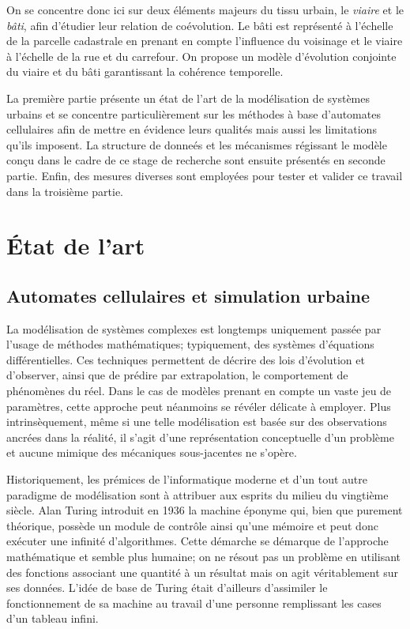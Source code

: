 \documentclass[12pt]{article}
\begin{document}
On se concentre donc ici sur deux éléments majeurs du tissu urbain, le
\textit{viaire} et le \textit{bâti}, afin d'étudier leur relation de
coévolution. Le bâti est représenté à l'échelle de la parcelle
cadastrale en prenant en compte l'influence du voisinage et le viaire
à l'échelle de la rue et du carrefour. On propose un modèle
d'évolution conjointe du viaire et du bâti garantissant la cohérence
temporelle.

La première partie présente un état de l'art de la modélisation de
systèmes urbains et se concentre particulièrement sur les méthodes à
base d'automates cellulaires afin de mettre en évidence leurs qualités
mais aussi les limitations qu'ils imposent. La structure de donneés et
les mécanismes régissant le modèle conçu dans le cadre de ce stage de
recherche sont ensuite présentés en seconde partie. Enfin, des mesures
diverses sont employées pour tester et valider ce travail dans la
troisième partie.

\section{\'Etat de l'art}

\subsection{Automates cellulaires et simulation urbaine}

La modélisation de systèmes complexes est longtemps uniquement passée
par l'usage de méthodes mathématiques; typiquement, des systèmes
d'équations différentielles. Ces techniques permettent de décrire des
lois d'évolution et d'observer, ainsi que de prédire par
extrapolation, le comportement de phénomènes du réel. Dans le cas de
modèles prenant en compte un vaste jeu de paramètres, cette approche
peut néanmoins se révéler délicate à employer. Plus intrinsèquement,
même si une telle modélisation est basée sur des observations ancrées
dans la réalité, il s'agit d'une représentation conceptuelle d'un
problème et aucune mimique des mécaniques sous-jacentes ne s'opère.

Historiquement, les prémices de l'informatique moderne et d'un tout
autre paradigme de modélisation sont à attribuer aux esprits du milieu
du vingtième siècle. Alan Turing introduit en 1936 la machine éponyme
qui, bien que purement théorique, possède un module de contrôle ainsi
qu'une mémoire et peut donc exécuter une infinité d'algorithmes. Cette
démarche se démarque de l'approche mathématique et semble plus
humaine; on ne résout pas un problème en utilisant des fonctions
associant une quantité à un résultat mais on agit véritablement sur
ses données. L'idée de base de Turing était d'ailleurs d'assimiler le
fonctionnement de sa machine au travail d'une personne remplissant les
cases d'un tableau infini.
\end{document}

